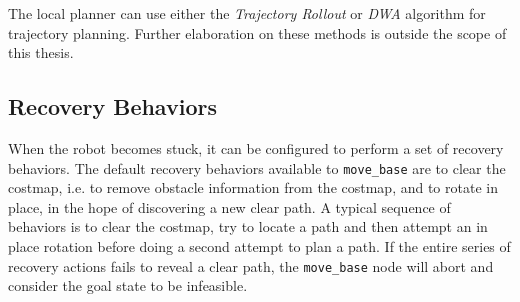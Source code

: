 The local planner can use either the \textit{Trajectory Rollout} or \textit{\ac{DWA}} algorithm for trajectory planning. Further elaboration on these methods is outside the scope of this thesis.

\subsection{Recovery Behaviors}

When the robot becomes stuck, it can be configured to perform a set of recovery behaviors. The default recovery behaviors available to \texttt{move\_base} are to clear the costmap, i.e. to remove obstacle information from the costmap, and to rotate in place, in the hope of discovering a new clear path. A typical sequence of behaviors is to clear the costmap, try to locate a path and then attempt an in place rotation before doing a second attempt to plan a path. If the entire series of recovery actions fails to reveal a clear path, the \texttt{move\_base} node will abort and consider the goal state to be infeasible\cite{koubaa2016robot}.